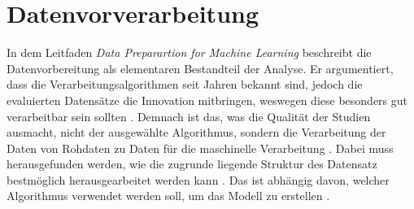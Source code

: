 \documentclass[12pt]{report}
\begin{document}
	\section{Datenvorverarbeitung}
	In dem Leitfaden \textit{Data Preparartion for Machine Learning} beschreibt \cite{Brownlee.2020} die Datenvorbereitung als elementaren Bestandteil der Analyse. Er argumentiert, dass die Verarbeitungsalgorithmen seit Jahren bekannt sind, jedoch die evaluierten Datensätze die Innovation mitbringen, weswegen diese besonders gut verarbeitbar sein sollten \cite[14]{Brownlee.2020}. Demnach ist das,  was die Qualität der Studien ausmacht, nicht der ausgewählte Algorithmus, sondern die Verarbeitung der Daten von Rohdaten zu Daten für die maschinelle Verarbeitung \cite[9]{Brownlee.2020}. Dabei muss herausgefunden werden, wie die zugrunde liegende Struktur des Datensatz bestmöglich herausgearbeitet werden kann \cite[8]{Brownlee.2020}. Das ist abhängig davon, welcher Algorithmus verwendet werden soll, um das Modell zu erstellen \cite[12]{Brownlee.2020}. 
\end{document}
